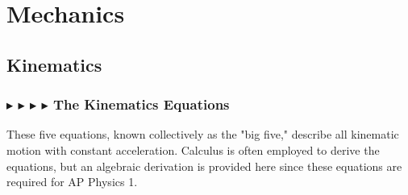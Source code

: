 %
%
%   

\chapter{Mechanics}\label{cap2}

%
%
%
%

\section{Kinematics}

%
%
\subsection{\color{OrangeRed} $\blacktriangleright$ \color{PineGreen} $\blacktriangleright$ \color{Goldenrod} $\blacktriangleright$ \color{Orchid} $\blacktriangleright$ \color{black} The Kinematics Equations}
These five equations, known collectively as the "big five," describe all kinematic motion with constant acceleration. Calculus is often employed to derive the equations, but an algebraic derivation is provided here since these equations are required for AP Physics 1. 

